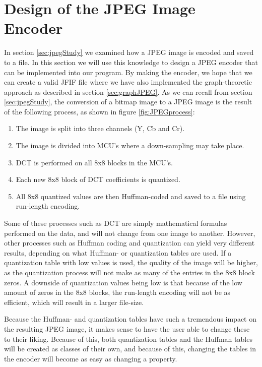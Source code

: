 \section{Design of the JPEG Image Encoder}
\label{sec:designJPEG}
In section \ref{sec:jpegStudy} we examined how a JPEG image is encoded and saved to a file.
In this section we will use this knowledge to design a JPEG encoder that can be implemented into our program.
By making the encoder, we hope that we can create a valid JFIF file where we have also implemented the graph-theoretic approach as described in section \ref{sec:graphJPEG}.
As we can recall from section \ref{sec:jpegStudy}, the conversion of a bitmap image to a JPEG image is the result of the following process, as shown in figure \ref{fig:JPEGprocess}:

\begin{enumerate}
	\item The image is split into three channels (Y, Cb and Cr).
	\item The image is divided into MCU's where a down-sampling may take place.
	\item DCT is performed on all 8x8 blocks in the MCU's.
	\item Each new 8x8 block of DCT coefficients is quantized.
	\item All 8x8 quantized values are then Huffman-coded and saved to a file using run-length encoding.
\end{enumerate}

Some of these processes such as DCT are simply mathematical formulas performed on the data, and will not change from one image to another.
However, other processes such as Huffman coding and quantization can yield very different results, depending on what Huffman- or quantization tables are used.
If a quantization table with low values is used, the quality of the image will be higher, as the quantization process will not make as many of the entries in the 8x8 block zeros.
A downside of quantization values being low is that because of the low amount of zeros in the 8x8 blocks, the run-length encoding will not be as efficient, which will result in a larger file-size.

Because the Huffman- and quantization tables have such a tremendous impact on the resulting JPEG image, it makes sense to have the user able to change these to their liking.
Because of this, both quantization tables and the Huffman tables will be created as classes of their own, and because of this, changing the tables in the encoder will become as easy as changing a property.

